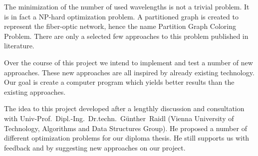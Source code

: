 \documentclass[paper=a4,fontsize=12pt]{scrartcl}
\begin{document}

The minimization of the number of used wavelengths is not a trivial problem. It is in fact a NP-hard optimization problem. A partitioned graph is created to represent the fiber-optic network, hence the name
Partition Graph Coloring Problem. There are only a selected few approaches to this problem published in literature.


Over the course of this project we intend to implement and test a number of new approaches. These new approaches are all inspired by already existing technology. Our goal is create a computer program which 
yields better results than the existing approaches. 


The idea to this project developed after a lengthly discussion and consultation with Univ-Prof.~Dipl.-Ing.~Dr.techn.~Günther~Raidl (Vienna University of Technology, Algorithms and Data Structures Group). He proposed a number of different optimization problems for our diploma thesis. He still supports us with feedback and by suggesting new approaches on our project. 

\end{document}
